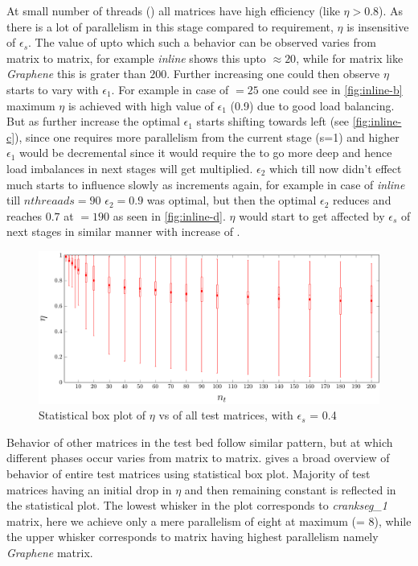 At small number of threads (\nthreads) all matrices have high efficiency (like $\eta>0.8$). As there is a lot of parallelism in this stage compared to requirement, $\eta$ is insensitive of $\epsilon_s$. The value of \nthreads upto which such a behavior can be observed varies from matrix to matrix, for example \emph{inline} shows this upto \nthreads$\approx20$, while for matrix like \emph{Graphene} this is grater than $200$.  Further increasing \nthreads one could then observe $\eta$ starts to vary with $\epsilon_1$. For example in case of \nthreads$ = 25$ one could see in \cref{fig:inline-b} maximum $\eta$ is achieved with high value of $\epsilon_1$ (0.9) due to good load balancing. But as 
\nthreads further increase the optimal $\epsilon_1$ starts shifting towards left (see \cref{fig:inline-c}),
 since one requires more parallelism from the current stage (s=1) and higher $\epsilon_1$ would be decremental since it would require the \levelTree to go more deep and hence load imbalances in next stages will get multiplied. $\epsilon_2$ which till now didn't effect much starts to influence slowly as \nthreads increments again, for example in case of \emph{inline} till $nthreaads=90$ $\epsilon_2=0.9$ was optimal, but then the optimal $\epsilon_2$ reduces and reaches $0.7$ at \nthreads$=190$ as seen in \cref{fig:inline-d}. $\eta$ would start to get affected by $\epsilon_s$ of next stages in similar manner with increase of \nthreads.
 
   \begin{figure}[tbhp]
   	\centering
   	\includegraphics[height=0.18\textheight,width=\textwidth]{pics/param_study/bar_plot}
   	\caption{Statistical box plot of $\eta$ vs \nthreads of all test matrices, with $\epsilon_s$ = 0.4}
   	\label{fig:param_all_mtx_stat}
   \end{figure}
   
Behavior of other matrices in the test bed follow similar pattern, but \nthreads at which different phases occur varies from matrix to matrix.   gives a broad overview of behavior of entire test matrices using statistical box plot. Majority of test matrices having an initial drop in $\eta$ and then remaining constant is reflected in the statistical plot. The lowest whisker in the plot corresponds to \emph{crankseg\_1} matrix, here we achieve only a mere parallelism of eight at maximum (\threadEff = 8), while the upper whisker corresponds to matrix having highest parallelism namely \emph{Graphene} matrix.

